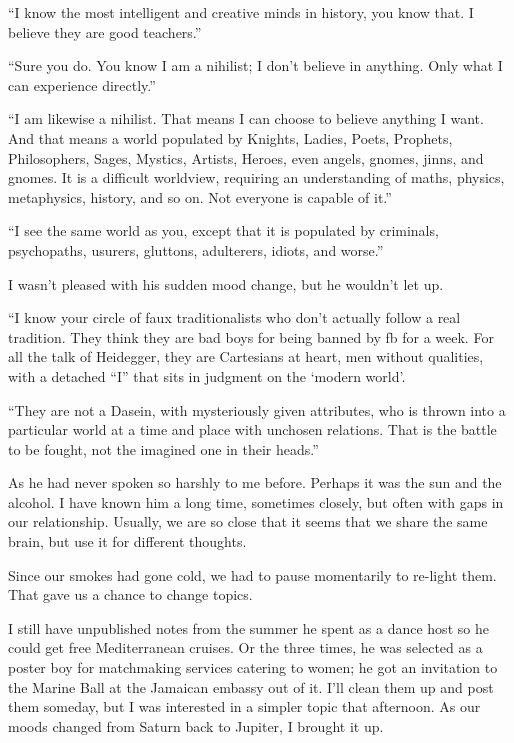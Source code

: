 ``I know the most intelligent and creative minds in history, you know that. I believe they are good teachers.''

``Sure you do. You know I am a nihilist; I don't believe in anything. Only what I can experience directly.''

``I am likewise a nihilist. That means I can choose to believe anything I want. And that means a world populated by Knights, Ladies, Poets, Prophets, Philosophers, Sages, Mystics, Artists, Heroes, even angels, gnomes, jinns, and gnomes. It is a difficult worldview, requiring an understanding of maths, physics, metaphysics, history, and so on. Not everyone is capable of it.''

``I see the same world as you, except that it is populated by criminals, psychopaths, usurers, gluttons, adulterers, idiots, and worse.''

I wasn't pleased with his sudden mood change, but he wouldn't let up.

``I know your circle of faux traditionalists who don't actually follow a real tradition. They think they are bad boys for being banned by fb for a week. For all the talk of Heidegger, they are Cartesians at heart, men without qualities, with a detached ``I'' that sits in judgment on the `modern world'.

``They are not a Dasein, with mysteriously given attributes, who is thrown into a particular world at a time and place with unchosen relations. That is the battle to be fought, not the imagined one in their heads.''

As he had never spoken so harshly to me before. Perhaps it was the sun and the alcohol. I have known him a long time, sometimes closely, but often with gaps in our relationship. Usually, we are so close that it seems that we share the same brain, but use it for different thoughts.\href{https://www.gornahoor.net/wp-content/uploads/2021/07/BrainInsideBrain.jpg}{}

Since our smokes had gone cold, we had to pause momentarily to re-light them. That gave us a chance to change topics.

I still have unpublished notes from the summer he spent as a dance host so he could get free Mediterranean cruises. Or the three times, he was selected as a poster boy for matchmaking services catering to women; he got an invitation to the Marine Ball at the Jamaican embassy out of it. I'll clean them up and post them someday, but I was interested in a simpler topic that afternoon. As our moods changed from Saturn back to Jupiter, I brought it up.


